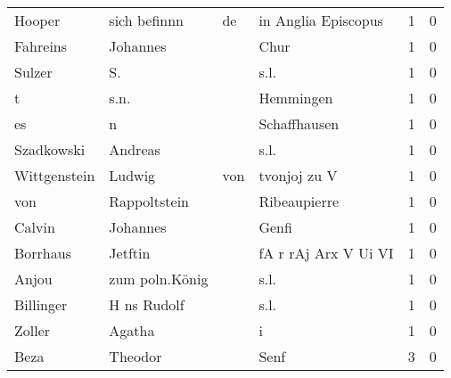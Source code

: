 \documentclass[10pt,a4paper,landscape]{article}
\begin{document}
\begin{longtable}{llllrr}
                   Hooper &                       sich befinnn &          de &                         in Anglia Episcopus &          1 &         0 \\
                 Fahreins &                           Johannes &             &                                        Chur &          1 &         0 \\
                   Sulzer &                                 S. &             &                                        s.l. &          1 &         0 \\
                        t &                               s.n. &             &                                   Hemmingen &          1 &         0 \\
                       es &                                  n &             &                                Schaffhausen &          1 &         0 \\
               Szadkowski &                            Andreas &             &                                        s.l. &          1 &         0 \\
             Wittgenstein &                             Ludwig &         von &                                tvonjoj zu V &          1 &         0 \\
                      von &                       Rappoltstein &             &                                Ribeaupierre &          1 &         0 \\
                   Calvin &                           Johannes &             &                                       Genfi &          1 &         0 \\
                 Borrhaus &                            Jetftin &             &                        fA r rAj Arx V Ui VI &          1 &         0 \\
                    Anjou &                     zum poln.König &             &                                        s.l. &          1 &         0 \\
                Billinger &                        H ns Rudolf &             &                                        s.l. &          1 &         0 \\
                   Zoller &                             Agatha &             &                                           i &          1 &         0 \\
                     Beza &                            Theodor &             &                                        Senf &          3 &         0 \\

\end{longtable}
\end{document}
